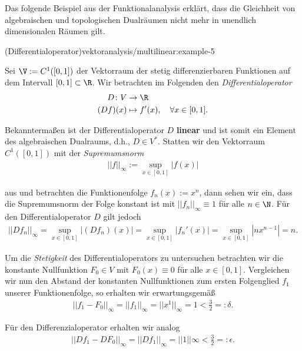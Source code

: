 \documentclass[letterpaper,10pt,german]{jupyterBook}
\begin{document}
\par
Das folgende Beispiel aus der Funktionalanalysis erklärt, dass die Gleichheit von algebraischen und topologischen Dualräumen nicht mehr in unendlich dimensionalen Räumen gilt.
\begin{example}{(Differentialoperator)}{vektoranalysis/multilinear:example-5}



\par
Sei \(\V := C^1([0,1])\) der Vektorraum der stetig differenzierbaren Funktionen auf dem Intervall \([0,1] \subset \R\).
Wir betrachten im Folgenden den \emph{Differentialoperator}
\begin{align*}
D \colon V &\rightarrow \R \\
(Df)(x) &\mapsto f'(x), \quad \forall x \in [0,1].
\end{align*}
\par
Bekanntermaßen ist der Differentialoperator \(D\) \textbf{linear} und ist somit ein Element des algebraischen Dualraums, d.h., \(D \in V^\ast\).
Statten wir den Vektorraum \(C^1([0,1])\) mit der \emph{Supremumsnorm}
\begin{align*}
||f||_\infty := \sup_{x \in [0,1]} |f(x)|
\end{align*}
\par
aus und betrachten die Funktionenfolge \(f_n(x) := x^n\), dann sehen wir ein, dass die Supremumsnorm der Folge konstant ist mit \(||f_n||_\infty \equiv 1\) für alle \(n\in\N\).
Für den Differentialoperator \(D\) gilt jedoch
\begin{align*}
||Df_n||_\infty = \sup_{x \in [0,1]} |(Df_n)(x)| = \sup_{x \in [0,1]} |f_n'(x)| = \sup_{x \in [0,1]} |nx^{n-1}| = n.
\end{align*}
\par
Um die \emph{Stetigkeit} des Differentialoperators zu untersuchen betrachten wir die konstante Nullfunktion \(F_0 \in V\) mit \(F_0(x) \equiv 0\) für alle \(x \in [0,1]\).
Vergleichen wir nun den Abstand der konstanten Nullfunktionen zum ersten Folgenglied \(f_1\) unserer Funktionenfolge, so erhalten wir erwartungsgemäß
\begin{align*}
||f_1 - F_0||_\infty = ||f_1||_\infty = ||x^1||_\infty = 1 < \frac{3}{2} =: \delta.
\end{align*}
\par
Für den Differenzialoperator erhalten wir analog
\begin{align*}
||Df_1 - DF_0||_\infty = ||Df_1||_\infty = ||1||\infty < \frac{3}{2} =: \epsilon.
\end{align*}

\end{example}
\end{document}
